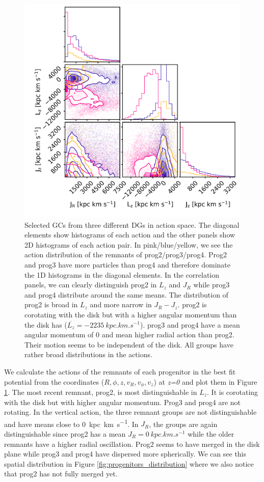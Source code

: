 \begin{figure}[htbp]
\captionsetup{format=plain}
    \centering
    \includegraphics[width=1.0\textwidth]{plots/Dynamics/prog234_GCwodisk_actions_snap_127.png}
    \caption{Selected \acp{GC} from three different \acp{DG} in action space. The diagonal elements show histograms of each action and the other panels show 2D histograms of each action pair. In pink/blue/yellow, we see the action distribution of the remnants of prog2/prog3/prog4. Prog2 and prog3 have more particles than prog4 and therefore dominate the 1D histograms in the diagonal elements. In the correlation panels, we can clearly distinguish prog2 in $L_z$ and $J_R$ while prog3 and prog4 distribute around the same means. The distribution of prog2 is broad in $L_z$ and more narrow in $J_R - J_z$. prog2 is corotating with the disk but with a higher angular momentum than the disk has (\(\overline{L_z} = \SI{-2235}{kpc.km.s^{-1}}\)). prog3 and prog4 have a mean angular momentum of 0 and mean higher radial action than prog2. Their motion seems to be independent of the disk. All groups have rather broad distributions in the actions.}
    \label{fig:act_all_merg_best_pot}
\end{figure}
We calculate the actions of the remnants of each progenitor in the best fit potential from the coordinates ($R, \phi, z, v_R, v_\phi, v_z$) at \textit{z=0} and plot them in Figure \ref{fig:act_all_merg_best_pot}. The most recent remnant, prog2, is most distinguishable in $L_z$. It is corotating with the disk but with higher angular momentum. Prog3 and prog4 are not rotating. In the vertical action, the three remnant groups are not distinguishable and have means close to \SI{0}{kpc.km.s^{-1}}. In $J_R$, the groups are again distinguishable since prog2 has a mean $J_R = \SI{0}{kpc.km.s^{-1}}$ while the older remnants have a higher radial oscillation. Prog2 seems to have merged in the disk plane while prog3 and prog4 have dispersed more spherically. We can see this spatial distribution in Figure \ref{fig:progenitors_distribution} where we also notice that prog2 has not fully merged yet.
